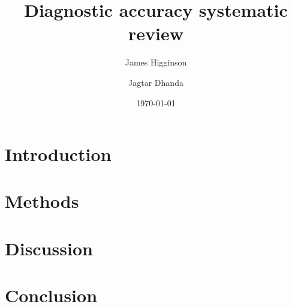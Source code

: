 

\title{Diagnostic accuracy systematic review}
\date{\today}
\author{
James Higginson \and
Jagtar Dhanda
}

  



\maketitle




\section{Introduction}



\section{Methods}


\section{Discussion}


\section{Conclusion}





\singlespacing
\printbibliography






